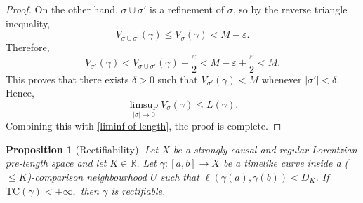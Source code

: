 \documentclass[hidelinks,12pt,a4paper]{article}
\numberwithin{equation}{section}
\theoremstyle{plain}
\newtheorem{proposition}[definition]{Proposition}
\theoremstyle{definition}
\newcommand{\R}{\mathbb R}
\newcommand{\eps}{\varepsilon}
\newcommand{\LpLS}{Lo\-rentz\-ian pre-length space }
\begin{document}
\begin{proof}
\noindent
On the other hand, $\sigma\cup\sigma'$ is a refinement of $\sigma$, so by the reverse triangle inequality,
\[
V_{\sigma\cup\sigma'}(\gamma)\le V_\sigma(\gamma)<M-\eps.
\]
Therefore,
\[
V_{\sigma'}(\gamma)
<
V_{\sigma\cup\sigma'}(\gamma)+\frac{\eps}{2}
<
M-\eps+\frac{\eps}{2}
<
M.
\]
This proves that there exists $\delta>0$ such that $V_{\sigma'}(\gamma)<M$ whenever $|\sigma'|<\delta$. Hence,
\[
\limsup_{|\sigma|\to 0}V_\sigma(\gamma)\le L(\gamma).
\]
Combining this with \eqref{liminf of length}, the proof is complete.
\end{proof}

\begin{proposition}[Rectifiability]
\label{prop: rectifiable}
Let $X$ be a  strongly causal and regular \LpLS and let $K \in \R$. 
Let $\gamma \colon[a,b] \to X$ be a timelike curve inside a ($\leq K$)-comparison neighbourhood $U$ such that $\ell(\gamma(a),\gamma(b)) < D_K$.
If $\mathrm{TC}(\gamma)<+\infty,$ then $\gamma$ is rectifiable.
\end{proposition}
\end{document}
